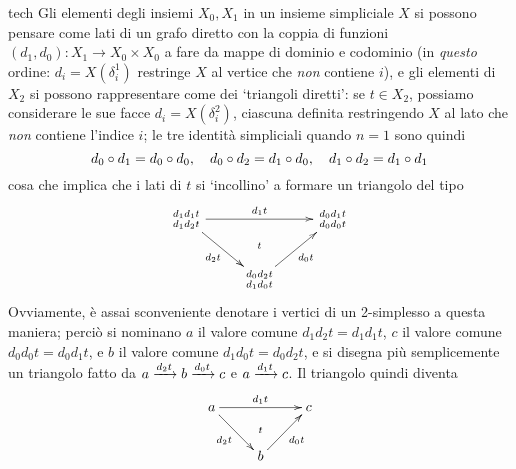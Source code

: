 \begin{hRemark}{tech}
	Gli elementi degli insiemi \(X_0, X_1\) in un insieme simpliciale \(X\) si possono pensare come lati di un grafo diretto con la coppia di funzioni \((d_1,d_0) : X_1 \to X_0\times X_0\) a fare da mappe di dominio e codominio (in \emph{questo} ordine: \(d_i = X(\delta^1_i)\) restringe \(X\) al vertice che \emph{non} contiene \(i\)), e gli elementi di \(X_2\) si possono rappresentare come dei `triangoli diretti': se \(t\in X_2\), possiamo considerare le sue facce \(d_i = X(\delta^2_i)\), ciascuna definita restringendo \(X\) al lato che \emph{non} contiene l'indice \(i\); le tre identità simpliciali quando \(n=1\) sono quindi
	\[
		d_0\circ d_1 = d_0\circ d_0,\quad
		d_0\circ d_2 = d_1\circ d_0,\quad
		d_1\circ d_2 = d_1\circ d_1
	\]
	cosa che implica che i lati di \(t\) si `incollino' a formare un triangolo del tipo
	\[\xymatrix{
			{\begin{smallmatrix}
						d_1d_1t \\
						d_1d_2t
					\end{smallmatrix}}
			\ar[rr]^{d_1t}\ar[dr]_{d_2t}&& {\begin{smallmatrix}
						d_0d_1t \\
						d_0d_0t
					\end{smallmatrix}}
			\\
			&{\begin{smallmatrix}
						d_0d_2t \\
						d_1d_0t
					\end{smallmatrix}}\ar[ur]_{d_0t}\ar@{}[u]|-t &
		}\]
	Ovviamente, è assai sconveniente denotare i vertici di un 2-simplesso a questa maniera; perciò si nominano \(a\) il valore comune \(d_1d_2t = d_1d_1t\), \(c\) il valore comune \(d_0d_0t = d_0d_1t\), e \(b\) il valore comune \(d_1d_0t = d_0d_2t\), e si disegna più semplicemente un triangolo fatto da \(a \xrightarrow{d_2t} b \xrightarrow{d_0t} c\) e \(a \xrightarrow{d_1t} c\). Il triangolo quindi diventa
	\[\xymatrix{
		a\ar[dr]_{d_2t} \ar[rr]^{d_1t} &\ar@{}[d]|-{t} & c \\
		& b\ar[ur]_{d_0t}
		}\]
\end{hRemark}

